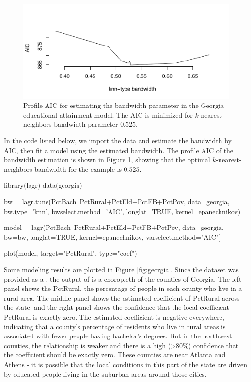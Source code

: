 \begin{figure}
\includegraphics[width=\textwidth]{figure/AIC.pdf}
\caption{Profile AIC for estimating the bandwidth parameter in the Georgia educational attainment model. The AIC is minimized for $k$-nearest-neighbors bandwidth parameter $0.525$.}
\label{fig:AIC}
\end{figure}

In the code listed below, we import the data and estimate the bandwidth by AIC, then fit a model using the estimated bandwidth. The profile AIC of the bandwidth estimation is shown in Figure \ref{fig:AIC}, showing that the optimal $k$-nearest-neighbors bandwidth for the example is $0.525$. 

\begin{example}
library(lagr)
data(georgia)

bw = lagr.tune(PctBach~PctRural+PctEld+PctFB+PctPov, data=georgia,
    bw.type='knn', bwselect.method='AIC', longlat=TRUE,
    kernel=epanechnikov)

model = lagr(PctBach~PctRural+PctEld+PctFB+PctPov, data=georgia, bw=bw,
     longlat=TRUE, kernel=epanechnikov, varselect.method="AIC")

plot(model, target="PctRural", type="coef")
\end{example}

Some modeling results are plotted in  Figure \ref{fig:georgia}. Since the dataset was provided as a , the output of  is a choropleth of the counties of Georgia. The left panel shows the PctRural, the percentage of people in each county who live in a rural area. The middle panel shows the estimated coefficient of PctRural across the state, and the right panel shows the confidence that the local coefficient PctRural is exactly zero. The estimated coefficient is negative everywhere, indicating that a county's percentage of residents who live in rural areas is associated with fewer people having bachelor's degrees. But in the northwest counties, the relationship is weaker and there is a high (>80\%) confidence that the coefficient should be exactly zero. These counties are near Atlanta and Athens - it is possible that the local conditions in this part of the state are driven by educated people living in the suburban areas around those cities.

